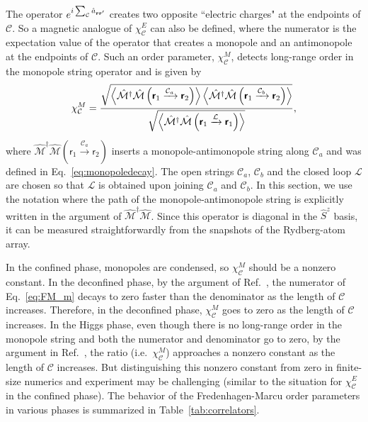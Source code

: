 \documentclass[twocolumn,superscriptaddress,amsmath,amssymb,aps,prx,nofootinbib]{revtex4-2}
\newcommand{\dual}[1]{\boldsymbol{\mathsf{#1}}}
\begin{document}
The operator $e^{i \sum_{\mathcal{C}} \hat{a}_{\vb{r} \vb{r}'}}$ creates two opposite ``electric charges" at the endpoints of $\mathcal{C}$. So a magnetic analogue of $\chi^E_\mathcal{C}$ can also be defined, where the  numerator is the expectation value of the operator that creates a monopole and an antimonopole at the endpoints of $\mathcal{C}$. Such an order parameter, $\chi_{\mathcal{C}}^M$, detects long-range order in the monopole string operator and is given by
\begin{equation}\label{eq:FM_m}
  \chi_{\mathcal{C}}^M = \frac{\sqrt{\expval{ \hat{\mathcal{M}}^{\dagger} \hat{\mathcal{M}}\left(\dual{r}_1 \xrightarrow{\mathcal{C}_a} \dual{r}_2\right) }\expval{ \hat{\mathcal{M}}^{\dagger} \hat{\mathcal{M}}\left(\dual{r}_1 \xrightarrow{\mathcal{C}_b} \dual{r}_2\right) }} }{  \sqrt{\expval{ \hat{\mathcal{M}}^{\dagger} \hat{\mathcal{M}}\left(\dual{r}_1 \xrightarrow{\mathcal{L}} \dual{r}_1\right)}}  },
\end{equation}
where $\hat{\mathcal{M}}^\dagger \hat{\mathcal{M}} (\dual{r}_1 \xrightarrow{\mathcal{C}_a} \dual{r}_2)$ inserts a monopole-antimonopole string along $\mathcal{C}_a$ and was defined in Eq.~\eqref{eq:monopoledecay}. The open strings $\mathcal{C}_a$, $\mathcal{C}_b$ and the closed loop $\mathcal{L}$ are chosen so that $\mathcal{L}$ is obtained upon joining $\mathcal{C}_a$ and $\mathcal{C}_b$. In this section, we use the notation where the path of the monopole-antimonopole string is explicitly written in the argument of $\hat{\mathcal{M}}^\dagger \hat{\mathcal{M}}$. 
Since this operator is diagonal in the $\hat{S}^z$ basis, it can be measured straightforwardly from the snapshots of the Rydberg-atom array.

In the confined phase, monopoles are condensed, so $\chi_{\mathcal{C}}^M$ should be a nonzero constant. In the deconfined phase, by the argument of Ref.~\cite{fredenhagen1986}, the numerator of Eq.~\eqref{eq:FM_m} decays to zero faster than the denominator as the length of $\mathcal{C}$ increases. Therefore, in the deconfined phase, $\chi_{\mathcal{C}}^M$ goes to zero as the length of $\mathcal{C}$ increases. In the Higgs phase, even though there is no long-range order in the monopole string and both the numerator and denominator go to zero, by the argument in Ref.~\cite{fredenhagen1986}, the ratio (i.e.~$\chi_{\mathcal{C}}^M$) approaches a nonzero constant as the length of $\mathcal{C}$ increases. But distinguishing this nonzero constant from zero in finite-size numerics and experiment may be challenging (similar to the situation for $\chi_{\mathcal{C}}^E$ in the confined phase). The behavior of the Fredenhagen-Marcu order parameters in various phases is summarized in Table~\ref{tab:correlators}.
\end{document}
